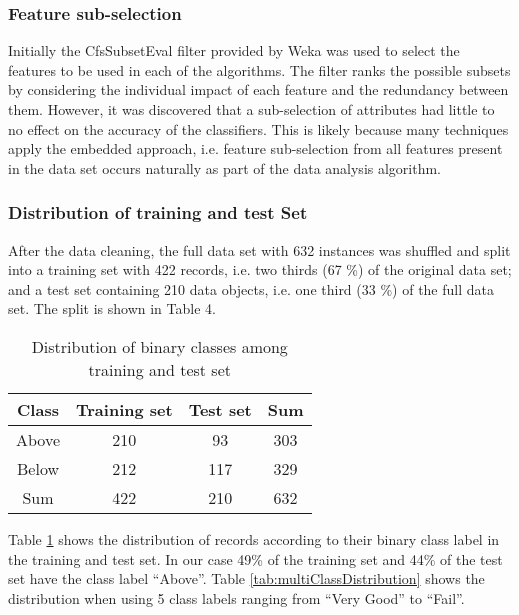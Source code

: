	    \subsubsection{Feature sub-selection}
	    Initially the CfsSubsetEval filter provided by Weka was used to select the features to be used in each of the algorithms. The filter ranks the possible subsets by considering the individual impact of each feature and the redundancy between them. However, it was discovered that a sub-selection of attributes had little to no effect on the accuracy of the classifiers. This is likely because many techniques apply the embedded approach, i.e. feature sub-selection from all features present in the data set occurs naturally as part of the data analysis algorithm.
	    
	    \subsubsection{Distribution of training and test Set}
	    After the data cleaning, the full data set with 632 instances was shuffled and split into a training set with 422 records, i.e. two thirds (67 \%) of the original data set; and a test set containing 210 data objects, i.e. one third (33 \%) of the full data set. The split is shown in Table 4.
	    
	    \begin{table}[h]
	        \centering
	        \begin{tabular}{cccc}
	        \hline
	            Class &  Training set & Test set & Sum\\ \hline
	            Above & 210 & 93  & 303 \\
	            Below & 212 & 117 & 329\\ \hline
	            Sum & 422 & 210 & 632 \\
	            \hline
	        \end{tabular}
	        \caption{Distribution of binary classes among training and test set}
	        \label{tab:binClassDistribution}
	    \end{table}
	    
	    Table \ref{tab:binClassDistribution} shows the distribution of records according to their binary class label in the training and test set. In our case 49\% of the training set and 44\% of the test set have the class label ``Above''. Table \ref{tab:multiClassDistribution} shows the distribution when using 5 class labels ranging from ``Very Good'' to ``Fail''.
	    
